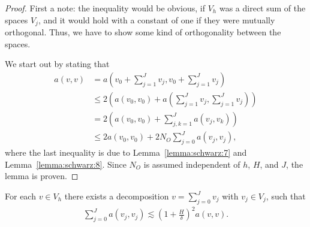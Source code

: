 \begin{proof}
  First a note: the inequality would be obvious, if $V_h$ was a direct
  sum of the spaces $V_j$, and it would hold with a constant of one if
  they were mutually orthogonal. Thus, we have to show some kind of
  orthogonality between the spaces.

  We start out by stating that
  \begin{align*}
    a(v,v) &= a\left(v_0+\sum_{j=1}^J v_j, v_0+\sum_{j=1}^J v_j\right)
    \\
    &\le 2 \left(a(v_0, v_0) + a\!\left(\sum_{j=1}^J v_j,\sum_{j=1}^J
        v_j\right)\right)
    \\
    &= 2 \left(a(v_0, v_0) + \sum_{j,k=1}^J a(v_j,v_k)\right) \\
    & \le 2 a(v_0, v_0) + 2 N_O \sum_{j=0}^J a(v_j, v_j),
  \end{align*}
  where the last inequality is due to Lemma~\ref{lemma:schwarz:7} and
  Lemma~\ref{lemma:schwarz:8}. Since $N_O$ is assumed independent of
  $h$, $H$, and $J$, the lemma is proven.
\end{proof}


\begin{lemma}
  \label{lemma:schwarz:stable-decomposition}
  For each $v\in V_h$ there exists a decomposition $v=\sum_{j=0}^J
  v_j$ with $v_j\in V_j$, such that
  \begin{gather}
    \label{eq:schwarz:13}
    \sum_{j=0}^J a(v_j, v_j)
    \lesssim \left(1+\frac H\delta\right)^2 a(v,v).
  \end{gather}
\end{lemma}

